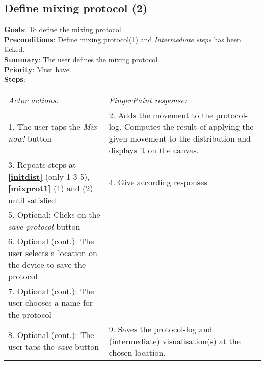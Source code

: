 \begin{appendices}
  \section{Define mixing protocol (2)}
  \label{mixprot2}
  \textbf{Goals}: To define the mixing protocol\\
  \textbf{Preconditions}: Define mixing protocol(1) and \emph{Intermediate steps} has been ticked.\\
  \textbf{Summary}: The user defines the mixing protocol\\
  \textbf{Priority}: Must have.\\
  \textbf{Steps}: \\
  \begin{tabular}{ p{} p{} }
  	\emph{Actor actions:} & \emph{FingerPaint response:} \\
    1. The user taps the \emph{Mix now!} button & 2.	Adds the movement to the protocol-log. Computes the result of applying the given movement to the distribution and displays it on the canvas.\\
    3.	Repeats steps at \textbf{\ref{initdist}} (only 1-3-5), \textbf{\ref{mixprot1}} (1) and (2) until satisfied & 4.	Give according responses\\
    5. Optional: Clicks on the \emph{save protocol} button & \\
    6. Optional (cont.): The user selects a location on the device to save the protocol & \\
    7. Optional (cont.): The user chooses a name for the protocol & \\
    8. Optional (cont.): The user taps the \emph{save} button & 9. Saves the protocol-log and (intermediate) visualisation(s) at the chosen location. \\

  \end{tabular}


\end{appendices}
